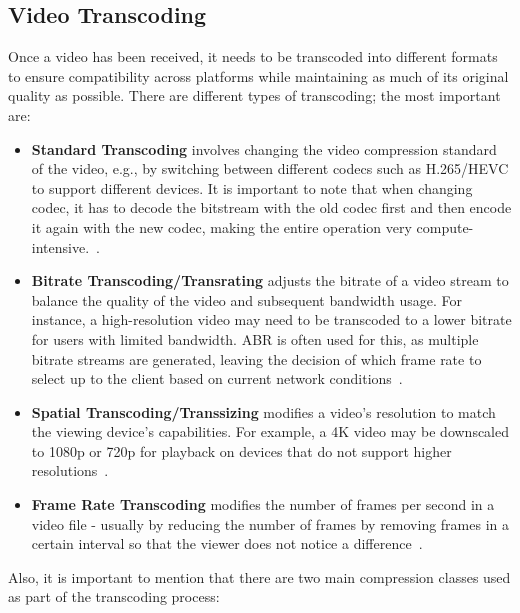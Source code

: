 \subsection{Video Transcoding}
Once a video has been received, it needs to be transcoded into different formats to ensure compatibility across platforms while maintaining as much of its original quality as possible. There are different types of transcoding; the most important are:

\begin{itemize}
    \item \textbf{Standard Transcoding} involves changing the video compression standard of the video, e.g., by switching between different codecs such as H.265/HEVC to support different devices. It is important to note that when changing codec, it has to decode the bitstream with the old codec first and then encode it again with the new codec, making the entire operation very compute-intensive.~\parencite{codec_transcoding}.
    \item \textbf{Bitrate Transcoding/Transrating} adjusts the bitrate of a video stream to balance the quality of the video and subsequent bandwidth usage. For instance, a high-resolution video may need to be transcoded to a lower bitrate for users with limited bandwidth. \ac{ABR} is often used for this, as multiple bitrate streams are generated, leaving the decision of which frame rate to select up to the client based on current network conditions~\parencite{transcoding}.
    \item \textbf{Spatial Transcoding/Transsizing} modifies a video's resolution to match the viewing device's capabilities. For example, a 4K video may be downscaled to 1080p or 720p for playback on devices that do not support higher resolutions~\parencite{cloud_streaming}.
    \item \textbf{Frame Rate Transcoding} modifies the number of frames per second in a video file - usually by reducing the number of frames by removing frames in a certain interval so that the viewer does not notice a difference~\parencite{transcoding}.
\end{itemize}

\noindent Also, it is important to mention that there are two main compression classes used as part of the transcoding process:

